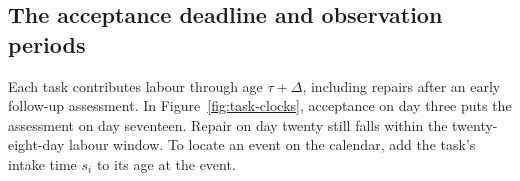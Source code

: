 \subsection{The acceptance deadline and observation periods}
\label{sec:event-history}

Each task contributes labour through age $\tau+\Delta$, including repairs after an early follow-up assessment. In Figure~\ref{fig:task-clocks}, acceptance on day three puts the assessment on day seventeen. Repair on day twenty still falls within the twenty-eight-day labour window. To locate an event on the calendar, add the task's intake time $s_i$ to its age at the event.


